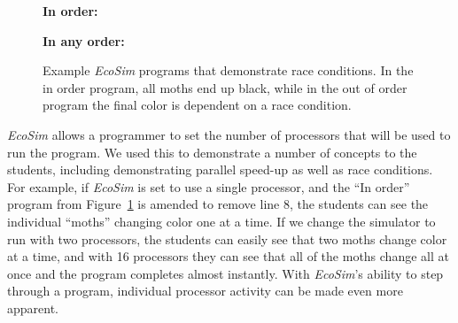 \documentclass{sig-alternate}
\newcommand{\INDSTATE}[1][1]{\STATE\hspace{#1\algorithmicindent}}
\begin{document}
     
\begin{figure}
\begin{algorithmic}[1]
\item[{\bf In order:}]
  \INDSTATE{a position}
  \INDSTATE{a color}
\STATE{}
  \INDSTATE{do in order}
  \INDSTATE[2]{replace the moth's color with gray}
  \INDSTATE[2]{replace the moth's color with black}
\end{algorithmic}

\begin{algorithmic}[1]
\item[{\bf In any order:}]
  \INDSTATE{a position}
  \INDSTATE{a color}
\STATE{}
  \INDSTATE{do in any order}
  \INDSTATE[2]{replace the moth's color with gray}
  \INDSTATE[2]{replace the moth's color with black}
\end{algorithmic} 
\caption{Example \emph{EcoSim} programs that demonstrate race conditions.  In the
in order program, all moths end up black, while in the out of order program
the final color is dependent on a race condition.}
\label{fig:race-conditions} 
\end{figure}

\emph{EcoSim} allows a programmer to set the number of processors that will be used to run the
program. We used this to demonstrate a number of concepts to the students, including demonstrating
parallel speed-up as well as race conditions.  For example, if \emph{EcoSim} is set to use a single
processor, and the ``In order'' program from Figure~\ref{fig:race-conditions} is amended to remove
line 8, the students can see the individual ``moths'' changing color one at a time.  If we change
the simulator to run with two processors, the students can easily see that two moths change color
at a time, and with 16 processors they can see that all of the moths change all at once and the
program completes almost instantly.  With \emph{EcoSim}'s ability to step through a program, 
individual processor activity can be made even more apparent.
\end{document}
